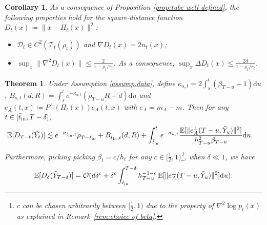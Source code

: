 \documentclass[10pt,a4paper]{amsart}
\newtheorem{theorem}{Theorem}
\newtheorem{corollary}{Corollary}
\newcommand{\dee}{\mathrm{d}}
\newcommand{\mb}{\mathbb}
\newcommand{\mc}{\mathcal}
\begin{document}
\begin{corollary}\label{cor:distance} As a consequence of Proposition \ref{prop:tube well-defined}, the following properties hold for the square-distance function $D_t(x)\coloneqq \| x-\Pi_t(x) \|^2$:
    \begin{itemize}
        \item [(1)] $\mc{D}_t\in C^2(\mc{T}_t(\rho_t))$ and $\nabla D_t(x)=2n_t(x)$;
        \item [(2)] $\sup_x \| \nabla^2 D_t(x) \|\le \tfrac{2}{1-\rho_t/r_t}$. As a consequence, $\sup_x \Delta D_t(x)\le \tfrac{2d}{1-\rho_t/r_t}$.
    \end{itemize}
\end{corollary}

\begin{theorem}\label{thm: formal normal contraciton} Under Assumption \ref{assump:data}, define $\kappa_{s,t}=2\int_s^t (\beta_{T-u}-1)\dee u$, $B_{s,t}(d,R)=\int_{s}^t e^{-\kappa_{u,t} } ( \rho_{T-u}R + d ) \dee u$ and $e_A^\perp(t,x)\coloneqq P^\perp(\Pi_t(x))e_A(t,x)$ with $e_A=m_A-m$. Then for any $t\in [\Tilde{t}_{\mathrm{in}},T-\delta]$,
{
    \begin{align*}
    \mb{E}[D_{T-t}(\Tilde{Y}_t)] &\lesssim e^{-\kappa_{\Tilde{t}_{\mathrm{in}},t} }\rho_{T-\Tilde{t}_{\mathrm{in}}}  + B_{\Tilde{t}_{\mathrm{in}},t}(d,R)  + \int_{\Tilde{t}_{\mathrm{in}}}^t e^{-\kappa_{u,t} } \frac{\mb{E}[\| e_A^\perp(T-u,\Tilde{Y}_u)\|^2]}{h_{T-u}^2\beta_{T-u}} \dee u. 
    \end{align*}}
    Furthermore, picking picking $\beta_t=c/h_t$ for any $c\in [\frac{1}{2},1)$\footnote{$c$ can be chosen arbitrarily between $[\tfrac{1}{2},1)$ due to the property of $\nabla^2\log p_t(x)$ as explained in Remark~\ref{rem:choice of beta}. }, when $\delta\ll 1$, we have
    {
\begin{align*}
    \mb{E}[D_{\delta}(\Tilde{Y}_{T-\delta})] = \mc{O}(d\delta^c+ \delta^c\int_{\Tilde{t}_{\mathrm{in}}}^{T-\delta}  h_{T-u}^{-1-c}\,{\mb{E}[\| e_A^\perp(T-u,\Tilde{Y}_u)\|^2]} \dee u  ).
\end{align*}}
\end{theorem}
\end{document}

